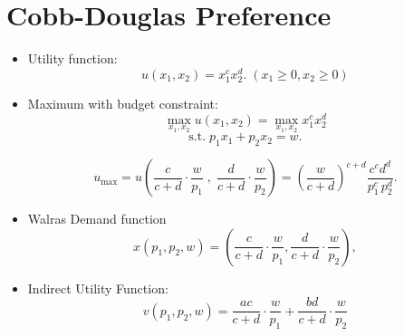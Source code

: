 \documentclass[
12pt, %
a4paper, %
onecolumn, %
portrait %
]{article}
\begin{document}
\section{Cobb-Douglas Preference}

\begin{itemize}
	\item Utility function:
	\[
	u(x_1,x_2)=x_1^cx_2^d.\;(x_1\ge0,x_2\ge 0)
	\]
	
	\item Maximum with budget constraint:
	\[
	\max_{x_1,x_2} u(x_1,x_2)=\max_{x_1,x_2}x_1^cx_2^d
	\]
	\[
	\text{s.t.}\;p_1x_1+p_2x_2=w.
	\]
	
	\[
	u_{\max}=u\left(\frac{c}{c+d}\cdot\frac{w}{p_1}\;,\;\frac{d}{c+d}\cdot\frac{w}{p_2}\right)=\left(\frac{w}{c+d}\right)^{c+d}\frac{c^cd^d}{p_1^c\,p_2^d}.
	\]
	
	\item Walras Demand function
	\[
	x(p_1,p_2,w)=\left(\frac{c}{c+d}\cdot\frac{w}{p_1},\frac{d}{c+d}\cdot\frac{w}{p_2}\right),
	\]
	\item Indirect Utility Function:
	\[
	v(p_1,p_2,w)=\frac{ac}{c+d}\cdot\frac{w}{p_1}+\frac{bd}{c+d}\cdot\frac{w}{p_2}
	\]

\end{itemize}
\end{document}
